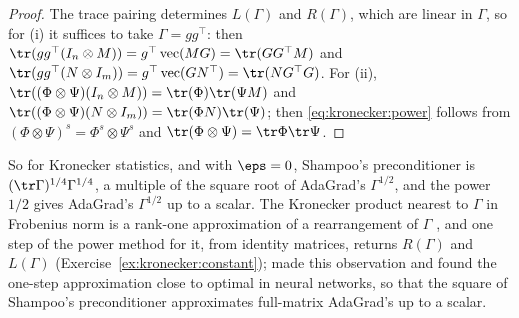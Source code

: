 \begin{refsection}

\begin{proof}
The trace pairing determines $L(\Gamma)$ and $R(\Gamma)$, which are linear in $\Gamma$, so for (i) it suffices to take $\Gamma=gg^\top$: then $\tr(gg^\top(I_n\otimes M))=g^\top\vect(MG)=\tr(GG^\top M)$ and $\tr(gg^\top(N\otimes I_m))=g^\top\vect(GN^\top)=\tr(NG^\top G)$. For (ii), $\tr((\Phi\otimes\Psi)(I_n\otimes M))=\tr(\Phi)\tr(\Psi M)$ and $\tr((\Phi\otimes\Psi)(N\otimes I_m))=\tr(\Phi N)\tr(\Psi)$; then \eqref{eq:kronecker:power} follows from $(\Phi\otimes\Psi)^s=\Phi^s\otimes\Psi^s$ and $\tr(\Phi\otimes\Psi)=\tr\Phi\tr\Psi$.
\end{proof}

So for Kronecker statistics, and with $\eps=0$, Shampoo's preconditioner is $(\tr\Gamma)^{1/4}\Gamma^{1/4}$, a multiple of the square root of AdaGrad's $\Gamma^{1/2}$, and the power $1/2$ gives AdaGrad's $\Gamma^{1/2}$ up to a scalar. The Kronecker product nearest to $\Gamma$ in Frobenius norm is a rank-one approximation of a rearrangement of $\Gamma$ \parencite{VanLoanPitsianis1993}, and one step of the power method for it, from identity matrices, returns $R(\Gamma)$ and $L(\Gamma)$ (Exercise~\ref{ex:kronecker:constant}); \textcite{MorwaniEtAl2025} made this observation and found the one-step approximation close to optimal in neural networks, so that the square of Shampoo's preconditioner approximates full-matrix AdaGrad's up to a scalar.


\end{refsection}
